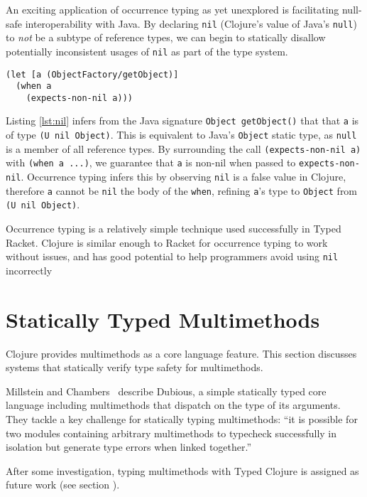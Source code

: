 An exciting application of occurrence typing as yet unexplored is facilitating null-safe interoperability with Java.
By declaring \lstinline|nil| (Clojure's value of Java's \lstinline|null|) to \emph{not} be a subtype of reference types,
we can begin to statically disallow potentially inconsistent usages of \lstinline|nil| as part of the type system.

\begin{lstlisting}[caption=Observing nil-checks using occurrence typing, label=lst:nil]
(let [a (ObjectFactory/getObject)]
  (when a
    (expects-non-nil a)))
\end{lstlisting}

Listing \ref{lst:nil} infers from the Java signature \lstinline|Object getObject()| that
that \lstinline|a| is of type \lstinline|(U nil Object)|. This is equivalent to Java's
\lstinline|Object| static type, as \lstinline|null| is a member of all reference types. By surrounding
the call \lstinline|(expects-non-nil a)| with \lstinline|(when a ...)|, we guarantee that
\lstinline|a| is non-nil when passed to \lstinline|expects-non-nil|. Occurrence typing infers
this by observing \lstinline|nil| is a false value in Clojure, therefore \lstinline|a| cannot
be \lstinline|nil| the body of the \lstinline|when|, refining \lstinline|a|'s type to \lstinline|Object|
from \lstinline|(U nil Object)|.

Occurrence typing is a relatively simple technique used successfully 
in Typed Racket. Clojure is similar enough to Racket for occurrence typing to work
without issues, and has good potential to help programmers avoid using
\lstinline|nil| incorrectly

\section{Statically Typed Multimethods}

Clojure provides multimethods as a core language feature. This section discusses systems that statically
verify type safety for multimethods.

Millstein and Chambers~\cite{MS02}
describe Dubious, a simple statically typed core language including multimethods that
dispatch on the type of its arguments. They tackle a key challenge for statically typing
multimethods: ``it is possible for two modules containing arbitrary multimethods to typecheck
successfully in isolation but generate type errors when linked together.''~\cite{MS02}

After some investigation, typing multimethods with Typed Clojure is assigned as future work
(see section \label{sec:mmfuture}).


